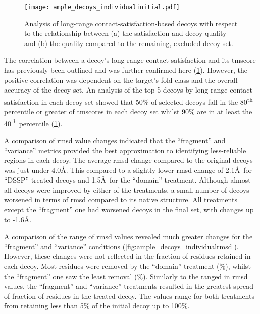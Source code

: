 \begin{figure}[H]
	\centering
	\texttt{[image: ample\_decoys\_individualinitial.pdf]}
        \caption[Selection of single decoys by long-range satisfaction]{Analysis of long-range contact-satisfaction-based decoys with respect to the relationship between (a) the satisfaction and decoy quality and (b) the quality compared to the remaining, excluded decoy set.}
	\label{fig:ample_decoys_individualinitial}
\end{figure}

The correlation between a decoy's long-range contact satisfaction and its \gls{tmscore} has previously been outlined and was further confirmed here (\cref{fig:ample_decoys_individualinitial}). However, the positive correlation was dependent on the target's fold class and the overall accuracy of the decoy set. An analysis of the top-5 decoys by long-range contact satisfaction in each decoy set showed that 50\% of selected decoys fall in the 80\textsuperscript{th} percentile or greater of \gls{tmscore}s in each decoy set whilst 90\% are in at least the 40\textsuperscript{th} percentile (\cref{fig:ample_decoys_individualinitial}).

A comparison of \gls{rmsd} value changes indicated that the ``fragment'' and ``variance'' metrics provided the best approximation to identifying less-reliable regions in each decoy. The average \gls{rmsd} change compared to the original decoys was just under 4.0\AA. This compared to a slightly lower \gls{rmsd} change of 2.1\AA\ for ``DSSP''-treated decoys and 1.5\AA\ for the ``domain'' treatment. Although almost all decoys were improved by either of the treatments, a small number of decoys worsened in terms of \gls{rmsd} compared to its native structure. All treatments except the ``fragment'' one had worsened decoys in the final set, with changes up to -1.6\AA. 

A comparison of the range of \gls{rmsd} values revealed much greater changes for the ``fragment'' and ``variance'' conditions (\cref{fig:ample_decoys_individualrmsd}). However, these changes were not reflected in the fraction of residues retained in each decoy. Most residues were removed by the ``domain'' treatment (\%), whilst the ``fragment'' one saw the least removal (\%). Similarly to the ranged in \gls{rmsd} values, the ``fragment'' and ``variance'' treatments resulted in the greatest spread of fraction of residues in the treated decoy. The values range for both treatments from retaining less than 5\% of the initial decoy up to 100\%.

